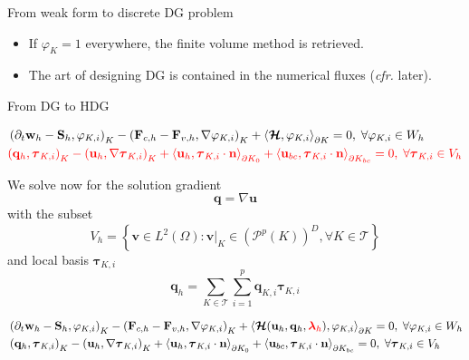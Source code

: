 \documentclass[24pt,t,table, aspectratio=169]{beamer}
\newcommand{\vecu}{\mathbf{u}}
\newcommand{\vecF}{\mathbf{F}}
\newcommand{\vecS}{\mathbf{S}}
\newcommand{\vecq}{\mathbf{q}}
\newcommand{\vecw}{\mathbf{w}}
\newcommand{\vectau}{\boldsymbol{\tau}}
\newcommand{\vecHcal}{\boldsymbol{\mathcal{H}}}
\newcommand{\veclambda}{\boldsymbol{\lambda}}
\newcommand{\tesselation}{\mathcal{T}}
\newcommand{\vecn}{\mathbf{n}}
\newcommand{\vecv}{\mathbf{v}}
\begin{document}
\begin{frame}{From weak form to discrete DG problem}
{\begin{itemize}
\item If $\varphi_K = 1$ everywhere, the finite volume method is retrieved.

\item The art of designing DG is contained in the numerical fluxes (\textit{cfr.} later).
\end{itemize}
}

\end{frame}

\begin{frame}{From DG to HDG}

{
\begin{equation*}
\begin{aligned}
& \left(\partial_t \vecw_{h} - \vecS_{h}, \varphi_{K,i} \right)_{K} - \left(\vecF_{c, {h}} - \vecF_{v, {h}}, \nabla \varphi_{K,i} \right)_{K} + \left\langle \vecHcal, \varphi_{K,i} \right\rangle_{\partial K} = 0, \; \forall \varphi_{K,i} \in W_h\\
& \textcolor{red}{\left(\vecq_h, \vectau_{K,i}\right)_{K} - \left(\vecu_h, \nabla \vectau_{K,i}\right)_{K} + \left\langle \vecu_h, \vectau_{K,i} \cdot \vecn \right\rangle_{\partial K_0} + \left\langle \vecu_{bc}, \vectau_{K,i} \cdot \vecn \right\rangle_{\partial K_{bc}} = 0,\; \forall \vectau_{K,i} \in V_h}
\end{aligned}
\end{equation*}

We solve now for the solution gradient
\begin{equation*}
\vecq = \nabla \vecu
\end{equation*}
with the subset
\begin{equation*}
V_h = \left\{\vecv \in L^2(\Omega) : \vecv|_K \in \left(\mathcal{P}^p(K)\right)^D, \forall K\in \tesselation\right\}
\end{equation*}
and local basis $\vectau_{K,i}$
\begin{equation*}
\vecq_h = \sum_{K\in\mathcal{T}}\sum_{i=1}^{p} \vecq_{K,i} \vectau_{K,i}
\end{equation*}

}

{
\begin{equation*}
\begin{aligned}
& \left(\partial_t \vecw_{h} - \vecS_{h}, \varphi_{K,i} \right)_{K} - \left(\vecF_{c, {h}} - \vecF_{v, {h}}, \nabla \varphi_{K,i} \right)_{K} + \left\langle \vecHcal(\vecu_h, \vecq_h, \textcolor{red}{\veclambda_h}), \varphi_{K,i} \right\rangle_{\partial K} = 0, \; \forall \varphi_{K,i} \in W_h\\
& \left(\vecq_h, \vectau_{K,i}\right)_{K} - \left(\vecu_h, \nabla \vectau_{K,i}\right)_{K} + \left\langle \vecu_h, \vectau_{K,i} \cdot \vecn \right\rangle_{\partial K_0} + \left\langle \vecu_{bc}, \vectau_{K,i} \cdot \vecn \right\rangle_{\partial K_{bc}} = 0,\; \forall \vectau_{K,i} \in V_h
\end{aligned}
\end{equation*}

}
\end{frame}
\end{document}
